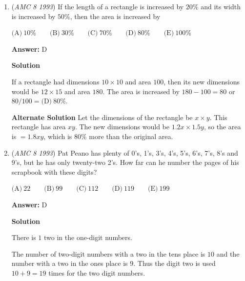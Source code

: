 \begin{enumerate}
 \textbf{Answer: }D



\textbf{Solution}


 \begin{align*} 10^2-93&=7\\ 10^3-93&=907\\ 10^4-93&=9907\\ \end{align*}


 This can be generalized into $10^n-93$ is equal is $n-2$ nines followed by the digits $07$. Then $10^{93}-93$ is equal to $91$ nines followed by $07$. The sum of the digits is equal to $9(91)+7=819+7=\boxed{\text{(D)}\ 826}$.

 


	\item (\textit{AMC 8 1993}) If the length of a rectangle is increased by $20\%$ and its width is increased by $50\%$, then the area is increased by 


 $\text{(A)}\ 10\% \qquad \text{(B)}\ 30\% \qquad \text{(C)}\ 70\% \qquad \text{(D)}\ 80\% \qquad \text{(E)}\ 100\%$

 \textbf{Answer: }D



\textbf{Solution}

If a rectangle had dimensions $10 \times 10$ and area $100$, then its new dimensions would be $12 \times 15$ and area $180$. The area is increased by $180-100=80$ or $80/100 = \boxed{\text{(D)}\ 80\%}$.

 \textbf{Alternate Solution} Let the dimensions of the rectangle be $x \times y$. This rectangle has area $xy$. The new dimensions would be $1.2x \times 1.5y$, so the area is $=1.8xy$, which is $\boxed{80\%}$ more than the original area.

 


	\item (\textit{AMC 8 1993}) Pat Peano has plenty of 0's, 1's, 3's, 4's, 5's, 6's, 7's, 8's and 9's, but he has only twenty-two 2's.  How far can he number the pages of his scrapbook with these digits?


 $\text{(A)}\ 22 \qquad \text{(B)}\ 99 \qquad \text{(C)}\ 112 \qquad \text{(D)}\ 119 \qquad \text{(E)}\ 199$

 \textbf{Answer: }D



\textbf{Solution}

There is $1$ two in the one-digit numbers.

 The number of two-digit numbers with a two in the tens place is $10$ and the number with a two in the ones place is $9$. Thus the digit two is used $10+9=19$ times for the two digit numbers.


\end{enumerate}
